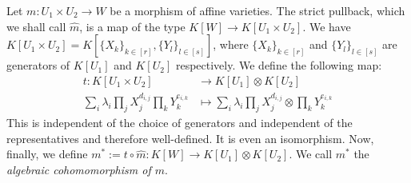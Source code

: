 \begin{definition}
  Let $m \colon U_1 \times U_2 \longrightarrow W$ be a morphism of affine varieties.
  The strict pullback, which we shall call $\hat{m}$, is a map of the type $K[W] \longrightarrow K[U_1 \times U_2]$.
  We have $ K[U_1 \times U_2] = K[\{X_k\}_{k\in[r]},\{Y_l\}_{l\in[s]}]$, where $\{X_k\}_{k\in[r]}$ and $\{Y_l\}_{l\in[s]}$ are generators of $K[U_1]$ and $K[U_2]$ respectively.
  We define the following map:
    \begin{equation}
    \begin{aligned}
      t \colon K[U_1 \times U_2]
      & \longrightarrow K[U_1] \otimes K[U_2]\\
      \sum_i \lambda_i \prod_j X_{j}^{d_{i,j}} \prod_k Y_{k}^{e_{i,k}} &\longmapsto \sum_i \lambda_i \prod_j X_{j}^{d_{i,j}} \otimes \prod_k Y_{k}^{e_{i,k}}
    \end{aligned}
  \end{equation}
  This is independent of the choice of generators and independent of the representatives and therefore well-defined.
  It is even an isomorphism.
  Now, finally, we define $m^\ast := t \circ \hat{m} : K[W] \longrightarrow K[U_1] \otimes K[U_2]$.
  We call $m^\ast$ the \textit{algebraic cohomomorphism of $m$}.
\end{definition}


